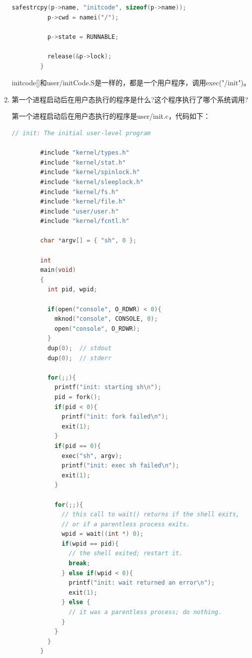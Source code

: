 \documentclass[UTF8]{article}
\begin{document}
\begin{enumerate}
\begin{lstlisting}[language=C]
          safestrcpy(p->name, "initcode", sizeof(p->name));
          p->cwd = namei("/");
        
          p->state = RUNNABLE;
        
          release(&p->lock);
        }
    \end{lstlisting}

    initcode[]和user/initCode.S是一样的，都是一个用户程序，调用exec("/init")。

    \item 第一个进程启动后在用户态执行的程序是什么?这个程序执行了哪个系统调用?
    
    第一个进程启动后在用户态执行的程序是user/init.c，代码如下：

    \begin{lstlisting}[language=C]
        // init: The initial user-level program

        #include "kernel/types.h"
        #include "kernel/stat.h"
        #include "kernel/spinlock.h"
        #include "kernel/sleeplock.h"
        #include "kernel/fs.h"
        #include "kernel/file.h"
        #include "user/user.h"
        #include "kernel/fcntl.h"
        
        char *argv[] = { "sh", 0 };
        
        int
        main(void)
        {
          int pid, wpid;
        
          if(open("console", O_RDWR) < 0){
            mknod("console", CONSOLE, 0);
            open("console", O_RDWR);
          }
          dup(0);  // stdout
          dup(0);  // stderr
        
          for(;;){
            printf("init: starting sh\n");
            pid = fork();
            if(pid < 0){
              printf("init: fork failed\n");
              exit(1);
            }
            if(pid == 0){
              exec("sh", argv);
              printf("init: exec sh failed\n");
              exit(1);
            }
        
            for(;;){
              // this call to wait() returns if the shell exits,
              // or if a parentless process exits.
              wpid = wait((int *) 0);
              if(wpid == pid){
                // the shell exited; restart it.
                break;
              } else if(wpid < 0){
                printf("init: wait returned an error\n");
                exit(1);
              } else {
                // it was a parentless process; do nothing.
              }
            }
          }
        }
    \end{lstlisting}
    

\end{enumerate}
\end{document}
